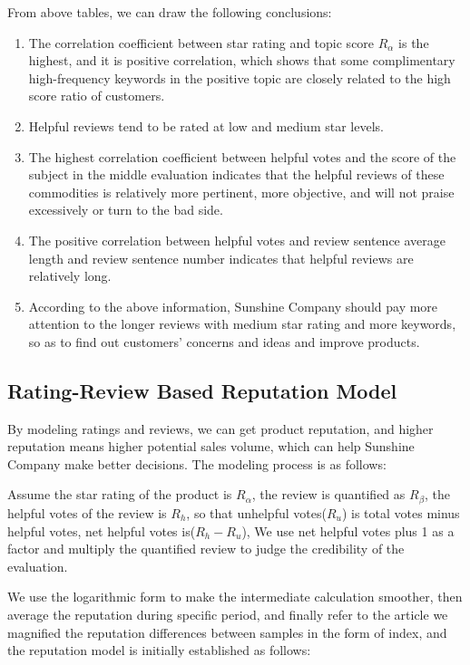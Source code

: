 \documentclass{mcmthesis}
\begin{document}
From above tables, we can draw the following conclusions:
\begin{enumerate}
	\item The correlation coefficient between star rating and topic score $R_{\alpha}$ is the highest, and it is positive correlation, which shows that some complimentary high-frequency keywords in the positive topic are closely related to the high score ratio of customers. 
	\item Helpful reviews tend to be rated at low and medium star levels.
	\item The highest correlation coefficient between helpful votes and the score of the subject in the middle evaluation indicates that the helpful reviews of these commodities is relatively more pertinent, more objective, and will not praise excessively or turn to the bad side.
	\item The positive correlation between helpful votes and review sentence average length and review sentence number indicates that helpful reviews are relatively long.
	\item According to the above information, Sunshine Company should pay more attention to the longer reviews with medium star rating and more keywords, so as to find out customers' concerns and ideas and improve products.
\end{enumerate}
\subsection{Rating-Review Based Reputation Model}
\label{task_b}
By modeling ratings and reviews, we can get product reputation, and higher reputation means higher potential sales volume, which can help Sunshine Company make better decisions. The modeling process is as follows:

Assume the star rating of the product is $R_{\alpha}$, the review is quantified as $R_{\beta}$, the helpful votes of the review is $R_{h}$, so that unhelpful votes($R_{u}$) is total votes minus helpful votes, net helpful votes is($R_{h}-R_{u}$), We use net helpful votes plus 1 as a factor and multiply the quantified review to judge the credibility of the evaluation.

We use the logarithmic form to make the intermediate calculation smoother, then average the reputation during specific period, and finally refer to the article\cite{subkhankulova2006comparative} we magnified the reputation differences between samples in the form of index, and the reputation model is initially established as follows:
\end{document}
